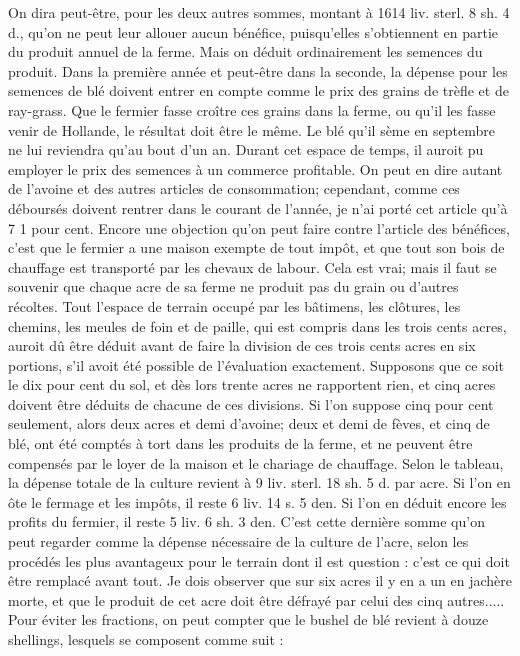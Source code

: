 On dira peut-être, pour les deux autres sommes, montant à 1614 liv. sterl. 8 sh. 4 d., qu'on ne peut leur allouer aucun bénéfice, puisqu'elles s'obtiennent en partie du produit annuel de la ferme. Mais on déduit ordinairement les semences du produit. Dans\setcounter{page}{328} la première année et peut-être dans la seconde, la dépense pour les semences de blé doivent entrer en compte comme le prix des grains de trèfle et de ray-grass. Que le fermier fasse croître ces grains dans la ferme, ou qu'il les fasse venir de Hollande, le résultat doit être le même. Le blé qu'il sème en septembre ne lui reviendra qu'au bout d'un an. Durant cet espace de temps, il auroit pu employer le prix des semences à un commerce profitable. On peut en dire autant de l'avoine et des autres articles de consommation; cependant, comme ces déboursés doivent rentrer dans le courant de l'année, je n'ai porté cet article qu'à 7 1 pour cent.
Encore une objection qu'on peut faire contre l'article des bénéfices, c'est que le fermier a une maison exempte de tout impôt, et que tout son bois de chauffage est transporté par les chevaux de labour. Cela est vrai; mais il faut se souvenir que chaque acre de sa ferme ne produit pas du grain ou d'autres récoltes. Tout l'espace de terrain occupé par les bâtimens, les clôtures, les chemins, les meules de foin et de paille, qui est compris dans les trois cents acres, auroit dû être déduit avant de faire la division\setcounter{page}{329} de ces trois cents acres en six portions, s'il avoit été possible de l'évaluation exactement. Supposons que ce soit le dix pour cent du sol, et dès lors trente acres ne rapportent rien, et cinq acres doivent être déduits de chacune de ces divisions. Si l'on suppose cinq pour cent seulement, alors deux acres et demi d'avoine; deux et demi de fèves, et cinq de blé, ont été comptés à tort dans les produits de la ferme, et ne peuvent être compensés par le loyer de la maison et le chariage de chauffage.
Selon le tableau, la dépense totale de la culture revient à 9 liv. sterl. 18 sh. 5 d. par acre. Si l'on en ôte le fermage et les impôts, il reste 6 liv. 14 s. 5 den. Si l'on en déduit encore les profits du fermier, il reste 5 liv. 6 sh. 3 den. C'est cette dernière somme qu'on peut regarder comme la dépense nécessaire de la culture de l'acre, selon les procédés les plus avantageux pour le terrain dont il est question : c'est ce qui doit être remplacé avant tout.
Je dois observer que sur six acres il y en a un en jachère morte, et que le produit de cet acre doit être défrayé par celui des cinq autres.....
\setcounter{page}{330}Pour éviter les fractions, on peut compter que le bushel de blé revient à douze shellings, lesquels se composent comme suit :
